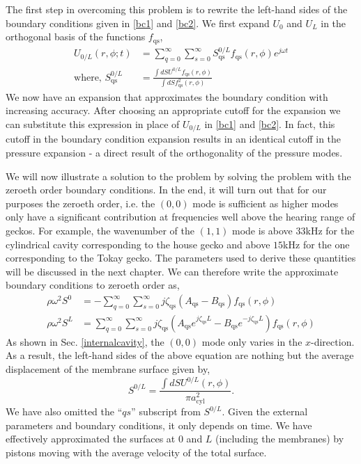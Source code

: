 The first step in overcoming this problem is to rewrite the left-hand sides of the boundary conditions given in \eqref{bc1} and \eqref{bc2}.
We first expand $U_{0}$ and $U_{L}$ in the orthogonal basis of the functions $f_{\mathrm{qs}}$,
\begin{align}
 U_{0/L}(r,\phi;t)&=\displaystyle\sum^\infty_{q=0}\displaystyle\sum^\infty_{s=0} S^{0/L}_{\mathrm{qs}}f_{\mathrm{qs}}(r,\phi)e^{j\omega t}\\
 \mbox{where, }S^{0/L}_{\mathrm{qs}}&=\frac{\int dS U^{0/L}f_{\mathrm{qs}}(r,\phi)}{\int dS f^2_{\mathrm{qs}}(r,\phi)}\label{approxboundarydef2}
\end{align}
We now have an expansion that approximates the boundary condition with increasing accuracy. After choosing an appropriate cutoff
for the expansion we can substitute this expression in place of $U_{0/L}$ in \eqref{bc1} and \eqref{bc2}. In fact, this cutoff in
the boundary condition expansion results in an identical cutoff in the pressure expansion - a direct result of the orthogonality
of the pressure modes. 

We will now illustrate a solution to the problem by solving the problem with the zeroeth order boundary conditions. 
In the end, it will turn out that for our purposes the zeroeth order, i.e. the $(0,0)$ mode is sufficient as higher modes only have a significant contribution at frequencies
well above the hearing range of geckos. For example, the wavenumber of the $(1,1)$ mode is above $33$kHz for the cylindrical cavity corresponding to the house gecko and 
above $15$kHz for the one corresponding to the Tokay gecko. The parameters used to derive these quantities will be discussed in the next chapter.
We can therefore write the approximate boundary conditions to zeroeth order as,
\begin{align}
   \rho\omega^2S^{0}&=-\displaystyle\sum^\infty_{q=0}\displaystyle\sum^\infty_{s=0}j\zeta_{\mathrm{qs}}\left(A_{\mathrm{qs}}-B_{\mathrm{qs}}\right)f_{\mathrm{qs}}(r,\phi) \label{bcfinal1}\\
   \rho\omega^2S^{L}&=\displaystyle\sum^\infty_{q=0}\displaystyle\sum^\infty_{s=0}j\zeta_{\mathrm{qs}}\left(A_{\mathrm{qs}}e^{j\zeta_{\mathrm{qs}}L}-B_{\mathrm{qs}}e^{-j\zeta_{\mathrm{qs}}L}\right)f_{\mathrm{qs}}(r,\phi) \label{bcfinal2}
\end{align}
As shown in Sec. \ref{internalcavity}, the $(0,0)$ mode only varies in the $x$-direction.
As a result, the left-hand sides of
the above equation are nothing but the average displacement of the membrane surface given by,
\begin{equation}\label{averagemembranedisp}
 S^{0/L}=\frac{\int dS U^{0/L}(r,\phi)}{\pi a^2_{\mathrm{cyl}}}.
\end{equation}
We have also omitted the ``$qs$'' subscript from $S^{0/L}$. 
Given the external parameters and boundary conditions, it only depends on time.
We have effectively approximated the surfaces at $0$ and $L$ (including the membranes) by pistons moving with the average velocity of the total surface.

